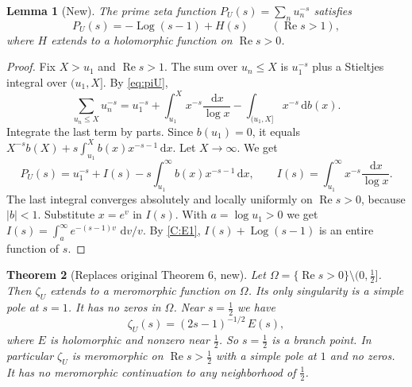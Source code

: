 \documentclass[12pt,letterpaper]{article}
\newtheorem{theorem}{Theorem}[section]
\newtheorem{lemma}[theorem]{Lemma}
\theoremstyle{definition}
\theoremstyle{remark}
\newcommand{\Log}{\operatorname{Log}}
\newcommand{\Ree}{\operatorname{Re}}
\newcommand{\dd}{\,\mathrm{d}}
\begin{document}
\begin{lemma}[New]\label{lem:PU}
The prime zeta function $P_U(s)=\sum_n u_n^{-s}$ satisfies
\[
P_U(s)=-\Log(s-1)+H(s)\qquad(\Ree s>1),
\]
where $H$ extends to a holomorphic function on $\Ree s>0$.
\end{lemma}

\begin{proof}
Fix $X>u_1$ and $\Ree s>1$. The sum over $u_n\le X$ is $u_1^{-s}$ plus a
Stieltjes integral over $(u_1,X]$. By \eqref{eq:piU},
\[
\sum_{u_n\le X}u_n^{-s}
=u_1^{-s}+\int_{u_1}^X x^{-s}\frac{\dd x}{\log x}
-\int_{(u_1,X]}x^{-s}\dd b(x).
\]
Integrate the last term by parts. Since $b(u_1)=0$, it equals
$X^{-s}b(X)+s\int_{u_1}^X b(x)x^{-s-1}\dd x$. Let $X\to\infty$. We get
\[
P_U(s)=u_1^{-s}+I(s)-s\int_{u_1}^\infty b(x)x^{-s-1}\dd x,
\qquad I(s)=\int_{u_1}^\infty x^{-s}\frac{\dd x}{\log x}.
\]
The last integral converges absolutely and locally uniformly on $\Ree s>0$,
because $|b|<1$. Substitute $x=e^v$ in $I(s)$. With $a=\log u_1>0$ we get
$I(s)=\int_a^\infty e^{-(s-1)v}\,\dd v/v$. By \ref{C:E1}, $I(s)+\Log(s-1)$
is an entire function of $s$.
\end{proof}

\begin{theorem}[Replaces original Theorem 6, new]\label{thm:slit}
Let $\Omega=\{\Ree s>0\}\setminus(0,\tfrac12]$. Then $\zeta_U$ extends to a
meromorphic function on $\Omega$. Its only singularity is a simple pole at
$s=1$. It has no zeros in $\Omega$. Near $s=\frac12$ we have
\[
\zeta_U(s)=(2s-1)^{-1/2}\,E(s),
\]
where $E$ is holomorphic and nonzero near $\tfrac12$. So $s=\tfrac12$ is a
branch point. In particular $\zeta_U$ is meromorphic on $\Ree s>\tfrac12$
with a simple pole at $1$ and no zeros. It has no meromorphic
continuation to any neighborhood of $\tfrac12$.
\end{theorem}
\end{document}
